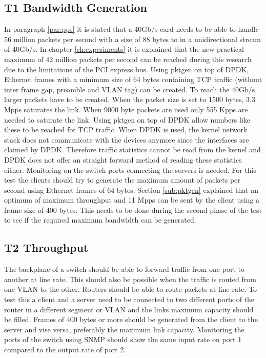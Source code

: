 \subsection{T1 Bandwidth Generation}
In paragraph \ref{par:pps} it is stated that a 40Gb/s card needs to be able to handle 56 million packets per second with a size of 88 bytes to in a unidirectional stream of 40Gb/s.
In chapter \ref{ch:experiments} it is explained that the new practical maximum of 42 million packets per second can be reached during this research due to the limitations of the PCI express bus.  
Using pktgen on top of DPDK, Ethernet frames with a minimum size of 64 bytes containing TCP traffic (without inter frame gap, preamble and VLAN tag) can be created. 
To reach the 40Gb/s, larger packets have to be created. 
When the packet size is set to 1500 bytes, 3.3 Mpps saturates the link. 
When 9000 byte packets are used only 555 Kpps are needed to saturate the link. 
Using pktgen on top of DPDK allow numbers like these to be reached for TCP traffic. 
When DPDK is used, the kernel network stack does not communicate with the devices anymore since the interfaces are claimed by DPDK. 
Therefore traffic statistics cannot be read from the kernel and DPDK does not offer an straight forward method of reading these statistics either. 
Monitoring on the switch ports connecting the servers is needed. 
For this test the clients should try to generate the maximum amount of packets per second using Ethernet frames of 64 bytes. 
Section \ref{sub:pktgen} explained that an optimum of maximum throughput and 11 Mpps can be sent by the client using a frame size of 400 bytes. This needs to be done during the second phase of the test to see if the required maximum bandwidth can be generated.  

\subsection{T2 Throughput}
The backplane of a switch should be able to forward traffic from one port to another at line rate. This should also be possible when the traffic is routed from one VLAN to the other. Routers should be able to route packets at line rate. To test this a client and a server need to be connected to two different ports of the router in a different segment or VLAN and the links maximum capacity should be filled. Frames of 400 bytes or more should be generated from the client to the server and vise versa, preferably the maximum link capacity. Monitoring the ports of the switch using SNMP should show the same input rate on port 1 compared to the output rate of port 2.    

